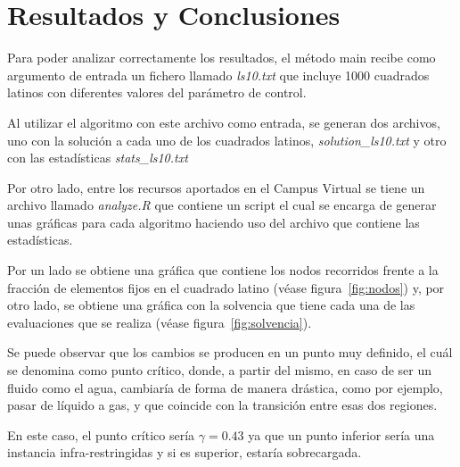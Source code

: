 \documentclass[11pt,letterpaper]{article}
\begin{document}
\section{Resultados y Conclusiones}
Para poder analizar correctamente los resultados, el método main recibe como argumento de entrada un fichero llamado \textit{ls10.txt} que incluye 1000 cuadrados latinos con diferentes valores del parámetro de control. 

Al utilizar el algoritmo con este archivo como entrada, se generan dos archivos, uno con la solución a cada uno de los cuadrados latinos, \textit{solution\_ls10.txt} y otro con las estadísticas \textit{stats\_ls10.txt}

Por otro lado, entre los recursos aportados en el Campus Virtual se tiene un archivo llamado \textit{analyze.R} que contiene un script el cual se encarga de generar unas gráficas para cada algoritmo haciendo uso del archivo que contiene las estadísticas.

Por un lado se obtiene una gráfica que contiene los nodos recorridos frente a la fracción de elementos fijos en el cuadrado latino (véase figura~\ref{fig:nodos}) y, por otro lado, se obtiene una gráfica con la solvencia que tiene cada una de las evaluaciones que se realiza (véase figura~\ref{fig:solvencia}).

Se puede observar que los cambios se producen en un punto muy definido, el cuál se denomina como punto crítico, donde, a partir del mismo, en caso de ser un fluido como el agua, cambiaría de forma de manera drástica, como por ejemplo, pasar de líquido a gas, y que coincide con la transición entre esas dos regiones.

En este caso, el punto crítico sería $\gamma = 0.43$ ya que un punto inferior sería una instancia infra-restringidas y si es superior, estaría sobrecargada.
\end{document}
